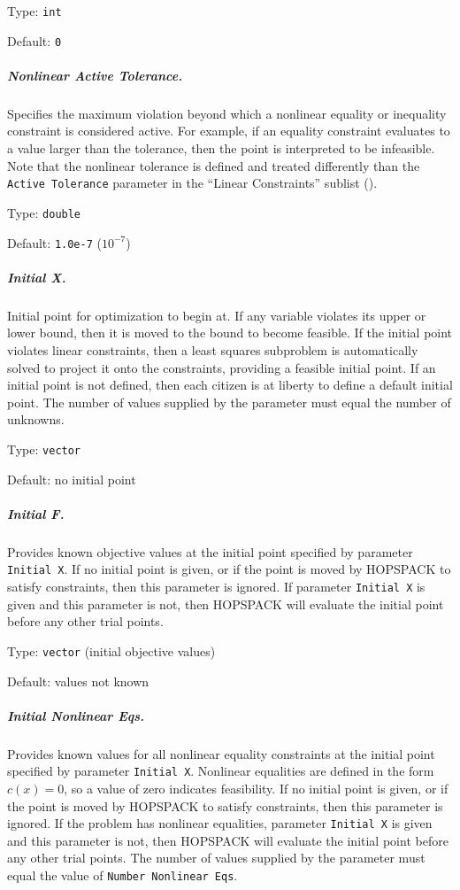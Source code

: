 \hspace{0.2in}
Type: {\tt int}

\hspace{0.2in}
Default: {\tt 0}

\subparagraph{Nonlinear Active Tolerance.}  \label{param:PD-nacttol}
Specifies the maximum violation beyond which a nonlinear equality or inequality
constraint is considered active.  For example, if an equality constraint
evaluates to a value larger than the tolerance, then the point is interpreted
to be infeasible.
Note that the nonlinear tolerance is defined and treated differently
than the {\tt Active Tolerance} parameter
in the ``Linear Constraints'' sublist ().

\hspace{0.2in}
Type: {\tt double}

\hspace{0.2in}
Default: {\tt 1.0e-7} ($10^{-7}$)

\subparagraph{Initial X.}  \label{param:PD-initx}
Initial point for optimization to begin at.  If any variable violates its
upper or lower bound, then it is moved to the bound to become feasible.
If the initial point violates linear constraints, then a least squares
subproblem is automatically solved to project it onto the constraints,
providing a feasible initial point.
If an initial point is not defined, then each citizen is at liberty to define
a default initial point.
The number of values supplied by the parameter must equal the number of unknowns.

\hspace{0.2in}
Type: {\tt vector}

\hspace{0.2in}
Default: no initial point

\subparagraph{Initial F.}  \label{param:PD-initf}
Provides known objective values at the initial point specified
by parameter {\tt Initial X}.  If no initial point is given, or if the
point is moved by HOPSPACK to satisfy constraints, then this parameter is
ignored.
If parameter {\tt Initial X} is given and this parameter is not, then
HOPSPACK will evaluate the initial point before any other trial points.

\hspace{0.2in}
Type: {\tt vector} (initial objective values)

\hspace{0.2in}
Default: values not known

\subparagraph{Initial Nonlinear Eqs.}  \label{param:PD-initeqs}
Provides known values for all nonlinear equality constraints at the initial
point specified by parameter {\tt Initial X}.
Nonlinear equalities are defined in the form $c(x) = 0$, so a value of zero
indicates feasibility.
If no initial point is given,
or if the point is moved by HOPSPACK to satisfy constraints, then this parameter
is ignored.
If the problem has nonlinear equalities, parameter {\tt Initial X} is given
and this parameter is not,
then HOPSPACK will evaluate the initial point before any other trial points.
The number of values supplied by the parameter must equal the value of
{\tt Number Nonlinear Eqs}.

